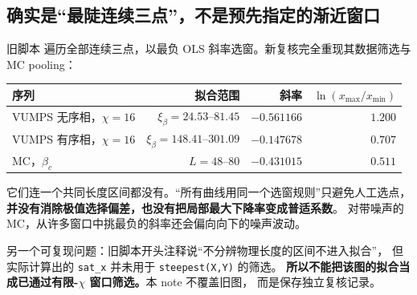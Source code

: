 \documentclass[11pt]{article}
\newcommand{\xb}{\xi_\beta}
\begin{document}
\subsection{确实是“最陡连续三点”，不是预先指定的渐近窗口}
旧脚本 
遍历全部连续三点，以最负 OLS 斜率选窗。新复核完全重现其数据筛选与 MC pooling：
\begin{center}
\begin{tabular}{lrrr}
\toprule
序列 & 拟合范围 & 斜率 & $\ln(x_{\max}/x_{\min})$\\
\midrule
VUMPS 无序相，$\chi=16$ & $\xb=24.53$--$81.45$ & $-0.561166$ & $1.200$\\
VUMPS 有序相，$\chi=16$ & $\xb=148.41$--$301.09$ & $-0.147678$ & $0.707$\\
MC，$\beta_c$ & $L=48$--$80$ & $-0.431015$ & $0.511$\\
\bottomrule
\end{tabular}
\end{center}
它们连一个共同长度区间都没有。“所有曲线用同一个选窗规则”只避免人工选点，
\textbf{并没有消除极值选择偏差，也没有把局部最大下降率变成普适系数}。
对带噪声的 MC，从许多窗口中挑最负的斜率还会偏向向下的噪声波动。

另一个可复现问题：旧脚本开头注释说“不分辨物理长度的区间不进入拟合”，
但实际计算出的 \texttt{sat\_x} 并未用于 \texttt{steepest(X,Y)} 的筛选。
\textbf{所以不能把该图的拟合当成已通过有限-$\chi$ 窗口筛选。}本 note 不覆盖旧图，
而是保存独立复核记录。
\end{document}
